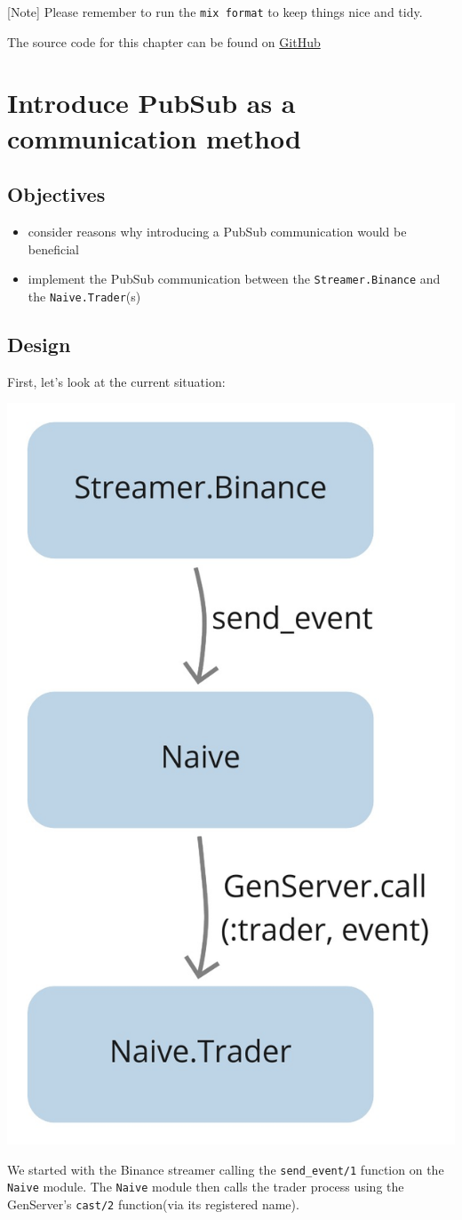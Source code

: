 \documentclass[
  oneside]{book}
\providecommand{\tightlist}{%
  \setlength{\itemsep}{0pt}\setlength{\parskip}{0pt}}
\begin{document}
{[}Note{]} Please remember to run the \texttt{mix\ format} to keep things nice and tidy.

The source code for this chapter can be found on \href{https://github.com/Cinderella-Man/hands-on-elixir-and-otp-cryptocurrency-trading-bot-source-code/tree/chapter_02}{GitHub}

\chapter{Introduce PubSub as a communication method}\label{introduce-pubsub-as-a-communication-method}

\section{Objectives}\label{objectives-2}

\begin{itemize}
\tightlist
\item
  consider reasons why introducing a PubSub communication would be beneficial
\item
  implement the PubSub communication between the \texttt{Streamer.Binance} and the \texttt{Naive.Trader}(s)
\end{itemize}

\section{Design}\label{design}

First, let's look at the current situation:

\begin{center}\includegraphics[width=0.3\linewidth]{images/chapter_03_01_current_situation} \end{center}

We started with the Binance streamer calling the \texttt{send\_event/1} function on the \texttt{Naive} module. The \texttt{Naive} module then calls the trader process using the GenServer's \texttt{cast/2} function(via its registered name).
\end{document}

